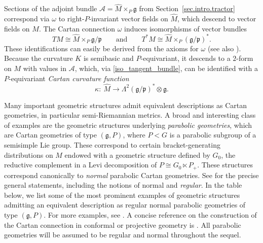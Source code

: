 \documentclass[10pt,a4paper]{amsart}
\numberwithin{equation}{section}
\theoremstyle{definition}
\newcommand{\lieg}{\mathfrak{g}}
\def\g{{\mathfrak g}}
\def\p{{\mathfrak p}}
\begin{document}
 Sections of the adjoint bundle $\mathcal{A} = \hat{M} \times_P \lieg$ from Section~\ref{sec.intro.tractor} correspond via $\omega$ to right-$P$-invariant vector fields on $\hat{M}$, which descend to vector fields on $M$.
The Cartan connection $\omega$ induces isomorphisms of vector bundles
 \begin{equation}\label{iso_tangent_bundle}
 TM\cong \hat{M} \times_P \g/\p\qquad\textrm{and}\qquad T^*M\cong \hat{M} \times_P (\g/\p)^*.
 \end{equation}
 These identifications can easily be derived from the axioms for $\omega$ (see also \cite[Theorem~5.3.15]{sharpe}).
 Because the curvature $K$ is semibasic and $P$-equivariant, it
 descends to a $2$-form on $M$ with values in $\mathcal{A}$, which, via \eqref{iso_tangent_bundle}, can be identified with a $P$-equivariant \emph{Cartan curvature function}
 \begin{equation*}
 \kappa\colon\ \hat{M} \rightarrow\Lambda^2 (\g/\p)^*\otimes \g.%
 \end{equation*}

Many important geometric structures admit equivalent descriptions as Cartan geometries, in particular semi-Riemannian metrics. A broad and interesting class of examples are the geometric structures underlying \emph{parabolic geometries}, which are Cartan geometries of type $(\g,P)$, where $P<G$ is a parabolic subgroup of a semisimple Lie group.
These correspond to certain bracket-generating distributions on $M$ endowed with a geometric structure defined by $G_0$, the reductive complement in a Levi decomposition of $P \cong G_0 \ltimes P_+$. These structures correspond canonically to \emph{normal} parabolic Cartan geometries. See \cite{cap.schichl.equiv,morimoto,tanaka} for the precise general statements, including the notions of normal and \emph{regular}.
In the table below, we list some of the most prominent examples of geometric structures admitting an equivalent description as regular normal parabolic geometries of type $(\g,P)$. For more examples, see \cite{cap.slovak.book.vol1}. A concise reference on the construction
of the Cartan connection in conformal or projective geometry is \cite[Section IV]{kobayashi.transf}. All parabolic geometries will be assumed to be regular and normal throughout the sequel.
\end{document}
